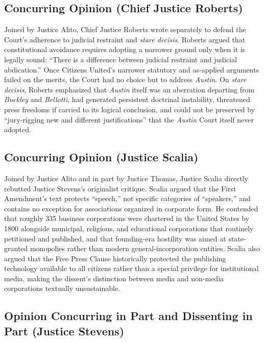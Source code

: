 \documentclass[12pt]{article}
\begin{document}
\subsection{Concurring Opinion (Chief Justice Roberts)}

Joined by Justice Alito, Chief Justice Roberts wrote separately to defend the Court's adherence to judicial restraint and \textit{stare decisis}. Roberts argued that constitutional avoidance requires adopting a narrower ground only when it is legally sound: ``There is a difference between judicial restraint and judicial abdication.'' Once Citizens United's narrower statutory and as-applied arguments failed on the merits, the Court had no choice but to address \textit{Austin}. On \textit{stare decisis}, Roberts emphasized that \textit{Austin} itself was an aberration departing from \textit{Buckley} and \textit{Bellotti}, had generated persistent doctrinal instability, threatened press freedoms if carried to its logical conclusion, and could not be preserved by ``jury-rigging new and different justifications'' that the \textit{Austin} Court itself never adopted.

\subsection{Concurring Opinion (Justice Scalia)}

Joined by Justice Alito and in part by Justice Thomas, Justice Scalia directly rebutted Justice Stevens's originalist critique. Scalia argued that the First Amendment's text protects ``speech,'' not specific categories of ``speakers,'' and contains no exception for associations organized in corporate form. He contended that roughly 335 business corporations were chartered in the United States by 1800 alongside municipal, religious, and educational corporations that routinely petitioned and published, and that founding-era hostility was aimed at state-granted monopolies rather than modern general-incorporation entities. Scalia also argued that the Free Press Clause historically protected the publishing technology available to all citizens rather than a special privilege for institutional media, making the dissent's distinction between media and non-media corporations textually unsustainable.

\subsection{Opinion Concurring in Part and Dissenting in Part (Justice Stevens)}
\end{document}
